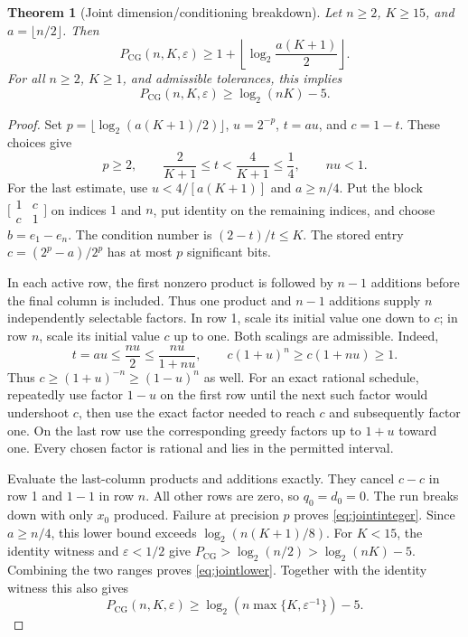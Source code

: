 \documentclass[11pt]{article}
\newtheorem{theorem}{Theorem}[section]
\theoremstyle{remark}\newtheorem{remark}[theorem]{Remark}
\newcommand{\PCG}{P_{\mathrm{CG}}}
\newcommand{\eps}{\varepsilon}
\begin{document}
\begin{theorem}[Joint dimension/conditioning breakdown]\label{thm:jointlower}
Let $n\ge2$, $K\ge15$, and $a=\lfloor n/2\rfloor$. Then
\begin{equation}\label{eq:jointinteger}
\PCG(n,K,\eps)\ge
1+\left\lfloor\log_2\frac{a(K+1)}2\right\rfloor.
\end{equation}
For all $n\ge2$, $K\ge1$, and admissible tolerances, this implies
\begin{equation}\label{eq:jointlower}
\PCG(n,K,\eps)\ge\log_2(nK)-5.
\end{equation}
\end{theorem}
\begin{proof}
Set $p=\lfloor\log_2(a(K+1)/2)\rfloor$, $u=2^{-p}$,
$t=au$, and $c=1-t$. These choices give
\[
p\ge2,\qquad \frac2{K+1}\le t<\frac4{K+1}\le\frac14,
\qquad nu<1.
\]
For the last estimate, use $u<4/[a(K+1)]$ and $a\ge n/4$.
Put the block $\bigl[\begin{smallmatrix}1&c\\c&1\end{smallmatrix}\bigr]$
on indices $1$ and $n$, put identity on the remaining indices, and
choose $b=e_1-e_n$. The condition number is $(2-t)/t\le K$.
The stored entry $c=(2^p-a)/2^p$ has at most $p$ significant bits.

In each active row, the first nonzero product is followed by $n-1$
additions before the final column is included. Thus one product and
$n-1$ additions supply $n$ independently selectable factors. In row 1,
scale its initial value one down to $c$; in row $n$, scale its initial
value $c$ up to one. Both scalings are admissible. Indeed,
\[
t=au\le\frac{nu}{2}\le\frac{nu}{1+nu},\qquad
c(1+u)^n\ge c(1+nu)\ge1.
\]
Thus $c\ge(1+u)^{-n}\ge(1-u)^n$ as well.
For an exact rational schedule, repeatedly use factor $1-u$ on the
first row until the next such factor would undershoot $c$, then use the
exact factor needed to reach $c$ and subsequently factor one. On the
last row use the corresponding greedy factors up to $1+u$ toward one.
Every chosen factor is rational and lies in the permitted interval.

Evaluate the last-column products and additions exactly. They cancel
$c-c$ in row 1 and $1-1$ in row $n$. All other rows are zero, so
$q_0=d_0=0$. The run breaks down with only $x_0$ produced. Failure at
precision $p$ proves \eqref{eq:jointinteger}.
Since $a\ge n/4$, this lower bound exceeds $\log_2(n(K+1)/8)$.
For $K<15$, the identity witness and $\eps<1/2$ give
$\PCG>\log_2(n/2)>\log_2(nK)-5$. Combining the two ranges proves
\eqref{eq:jointlower}. Together with the identity witness this also gives
\[
\PCG(n,K,\eps)\ge
\log_2\left(n\max\{K,\eps^{-1}\}\right)-5.
\]
\end{proof}
\end{document}
